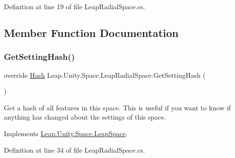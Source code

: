 Definition at line 19 of file Leap\+Radial\+Space.\+cs.



\subsection{Member Function Documentation}
\mbox{\label{class_leap_1_1_unity_1_1_space_1_1_leap_radial_space_a65716a3a40c5dc3bcf957b05f878960c}} 
\subsubsection{\texorpdfstring{GetSettingHash()}{GetSettingHash()}}
{\footnotesize\ttfamily override \mbox{\hyperlink{struct_leap_1_1_unity_1_1_hash}{Hash}} Leap.\+Unity.\+Space.\+Leap\+Radial\+Space.\+Get\+Setting\+Hash (\begin{DoxyParamCaption}{ }\end{DoxyParamCaption})\hspace{0.3cm}{\ttfamily [virtual]}}



Get a hash of all features in this space. This is useful if you want to know if anything has changed about the settings of this space. 



Implements \mbox{\hyperlink{class_leap_1_1_unity_1_1_space_1_1_leap_space_a42752b3c5be3fadbca02e0060a8cc7ea}{Leap.\+Unity.\+Space.\+Leap\+Space}}.



Definition at line 34 of file Leap\+Radial\+Space.\+cs.

\mbox{\label{class_leap_1_1_unity_1_1_space_1_1_leap_radial_space_afc597bb7c75791b2f8807b3b810e8c69}} 
